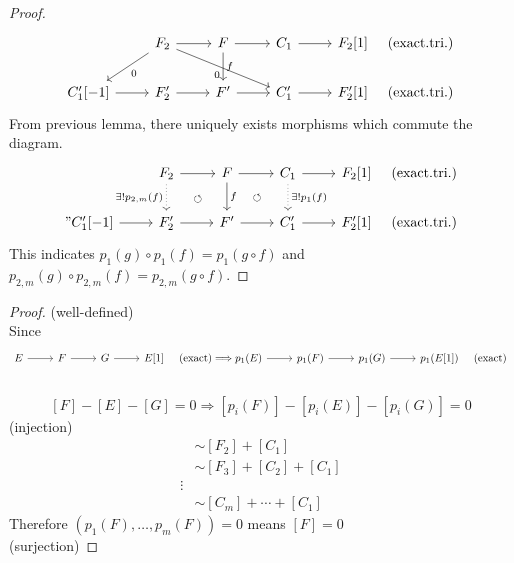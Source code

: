 \documentclass[leqno]{ltjsarticle}
\begin{document}
\begin{proof}
	\[
	\begin{tikzcd}
		&F_{2}\ar[ld,"0"]\ar[rrd,swap,"0"]\ar[r]&F\ar[r]\ar[d,"f"]&C_{1}\ar[r]&F_2[1]\hspace{5mm} \text{(exact.tri.)}\\
		C'_1[-1]\ar[r]&F'_{2}\ar[r]&F'\ar[r]&C'_{1}\ar[r]&F'_2[1]\hspace{5mm} \text{(exact.tri.)}
	\end{tikzcd}
\]
From previous lemma, there uniquely exists morphisms which commute the diagram.
	\[
	\begin{tikzcd}
		&F_{2}\ar[d,dotted,swap,"\exists !p_{2,m}(f)"]\ar[r]&F\ar[r]\ar[d,"f"]&C_{1}\ar[d,dotted,"\exists !p_1(f)"]\ar[r]&F_2[1]\hspace{5mm} \text{(exact.tri.)}\\
	"	C'_1[-1]\ar[r]&F'_{2}\ar[r]&F'\ar[r]&C'_{1}\ar[r]&F'_2[1]\hspace{5mm} \text{(exact.tri.)}
	\arrow[draw=none, from=1-2, to=2-3,shift right=3,"\circlearrowleft"]
	\arrow[draw=none, from=1-3, to=2-4,shift right=3,"\circlearrowleft"]
	\end{tikzcd}
\]
This indicates $p_1(g)\circ p_1(f) = p_1(g\circ f)$ and $p_{2,m}(g)\circ p_{2,m}(f) = p_{2,m}(g\circ f)$.
\end{proof}

\begin{proof}
	(well-defined)\\
	Since 
	\[\begin{tikzcd}
		E\ar[r]& F\ar[r]&G\ar[r]& E[1] \hspace{5mm}\text{(exact)}\Longrightarrow p_1(E)\ar[r]&p_1(F)\ar[r]&p_1(G)\ar[r]&p_1(E[1])\hspace{5mm}\text{(exact)}\\
	\end{tikzcd}\]
	\[ [F]-[E]-[G]=0\Longrightarrow [p_i(F)] - [p_i(E)] - [p_i(G)] = 0\]
	(injection)\\
	\begin{align*}
		[F]&\sim [F_2] + [C_1]\\
			&\sim [F_3] + [C_2] + [C_1] \\
			\vdots\\
			&\sim [C_m] + \cdots + [C_1]
	\end{align*}
	Therefore $(p_1(F),\ldots, p_m(F)) = 0$ means $[F] = 0$\\
	(surjection)
\end{proof}

\end{document}

